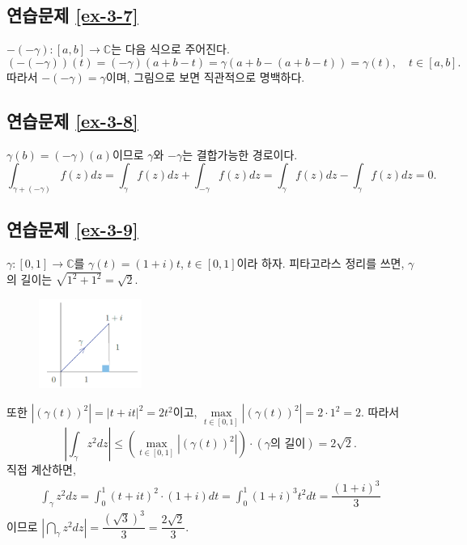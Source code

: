 \subsection*{연습문제 \ref{ex-3-7}}

$-(-\gamma): [a,b] \to \mathbb C$는 다음 식으로 주어진다.
\[
(-(-\gamma))(t)= (-\gamma)(a+b-t) = \gamma(a+b-(a+b-t)) = \gamma(t),
\quad t\in[a,b].
\]
따라서 $-(-\gamma) = \gamma$이며, 그림으로 보면 직관적으로 명백하다.

\subsection*{연습문제 \ref{ex-3-8}}

$\gamma(b) = (-\gamma)(a)$이므로
$\gamma$와 $-\gamma$는 결합가능한 경로이다.
\[
\int_{\gamma+(-\gamma)} f(z) dz = \int_\gamma f(z) dz + \int_{-\gamma} f(z)dz
=  \int_\gamma f(z) dz - \int_\gamma f(z) dz = 0.
\]

\subsection*{연습문제 \ref{ex-3-9}}

$\gamma:[0,1] \to \mathbb C$를 $\gamma(t) = (1+i)t$, $t\in [0,1]$이라 하자.
피타고라스 정리를 쓰면, $\gamma$의 길이는 $\sqrt{1^2+1^2} = \sqrt{2}$.

\begin{figure}[h!]
\begin{center}
\includegraphics[width=0.3\textwidth]{./figs/fig-s-0-8}
\end{center}
\end{figure}

또한 $|(\gamma(t))^2| = |t+it|^2 = 2t^2$이고,
$\max\limits_{t\in[0,1]} |(\gamma(t))^2| = 2\cdot 1^2 = 2$.
따라서
\[
\left| \int_\gamma z^2dz \right|
\le \left( \max\limits_{t\in[0,1]} |(\gamma(t))^2|  \right) \cdot
(\text{$\gamma$의 길이})
= 2\sqrt{2}.
\]
직접 계산하면,
\begin{align*}
\int_\gamma z^2 dz = \int_0^1 (t+it)^2\cdot(1+i)dt
= \int_0^1 (1+i)^3t^2dt = \dfrac{(1+i)^3}3
\end{align*}
이므로
$\left| \dint_\gamma z^2 dz \right| = \dfrac{(\sqrt{3})^3}3 = \dfrac{2\sqrt{2}}3$.

